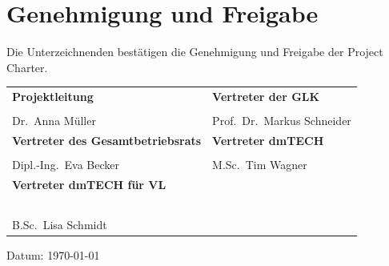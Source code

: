 \vspace*{15mm}
\chapter*{Genehmigung und Freigabe}

Die Unterzeichnenden bestätigen die Genehmigung und Freigabe der Project Charter.

\vspace*{10mm}
\begin{center}
\noindent
\begin{tabular}{p{8cm} p{8cm}}
    \textbf{Projektleitung} & \textbf{Vertreter der GLK} \\[12mm]
    \hrulefill & \hrulefill \\[-1ex]
    Dr.\ Anna Müller & Prof.\ Dr.\ Markus Schneider \\[10mm]
    \textbf{Vertreter des Gesamtbetriebsrats} & \textbf{Vertreter dmTECH} \\[12mm]
    \hrulefill & \hrulefill \\[-1ex]
    Dipl.-Ing.\ Eva Becker & M.Sc.\ Tim Wagner \\[10mm]
    \textbf{Vertreter dmTECH für VL} & ~ \\[12mm]
    \hrulefill & ~ \\[-1ex]
    B.Sc.\ Lisa Schmidt & ~ \\
\end{tabular}
\end{center}

\vspace*{5mm}
\noindent
Datum: \today
